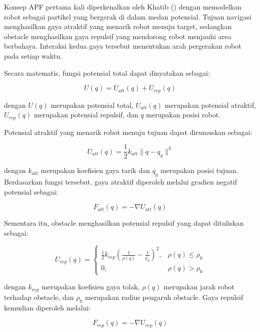 Konsep APF pertama kali diperkenalkan oleh Khatib (\cite{Khatib1986}) dengan memodelkan robot sebagai partikel yang bergerak di dalam medan potensial. Tujuan navigasi menghasilkan gaya atraktif yang menarik robot menuju target, sedangkan obstacle menghasilkan gaya repulsif yang mendorong robot menjauhi area berbahaya. Interaksi kedua gaya tersebut menentukan arah pergerakan robot pada setiap waktu.

Secara matematis, fungsi potensial total dapat dinyatakan sebagai:

\begin{equation}
U(q)=U_{att}(q)+U_{rep}(q)
\label{eq:apf_total}
\end{equation}

dengan $U(q)$ merupakan potensial total, $U_{att}(q)$ merupakan potensial atraktif, $U_{rep}(q)$ mer\-upakan potensial repulsif, dan $q$ merupakan posisi robot.

Potensial atraktif yang menarik robot menuju tujuan dapat dirumuskan sebagai:

\begin{equation}
U_{att}(q)=\frac{1}{2}k_{att}\|q-q_g\|^2
\label{eq:apf_attractive}
\end{equation}

dengan $k_{att}$ merupakan koefisien gaya tarik dan $q_g$ merupakan posisi tujuan. Berdasarkan fungsi tersebut, gaya atraktif diperoleh melalui gradien negatif potensial sebagai:

\begin{equation}
F_{att}(q)=-\nabla U_{att}(q)
\label{eq:f_att}
\end{equation}

Sementara itu, obstacle menghasilkan potensial repulsif yang dapat dituliskan sebagai:

\begin{equation}
U_{rep}(q)=
\begin{cases}
\frac{1}{2}k_{rep}
\left(
\frac{1}{\rho(q)}
-\frac{1}{\rho_0}
\right)^2,
&
\rho(q)\leq\rho_0
\\
0,
&
\rho(q)>\rho_0
\end{cases}
\label{eq:apf_repulsive}
\end{equation}

dengan $k_{rep}$ merupakan koefisien gaya tolak, $\rho(q)$ merupakan jarak robot terhadap obstacle, dan $\rho_0$ merupakan radius pengaruh obstacle. Gaya repulsif kemudian diperoleh melalui:

\begin{equation}
F_{rep}(q)=-\nabla U_{rep}(q)
\label{eq:f_rep}
\end{equation}

